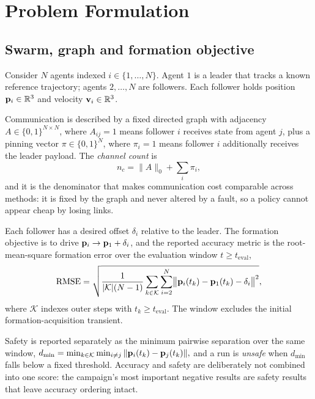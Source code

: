 \section{Problem Formulation}
\label{sec:problem}

\subsection{Swarm, graph and formation objective}

Consider $N$ agents indexed $i \in \{1,\dots,N\}$. Agent $1$ is a leader
that tracks a known reference trajectory; agents $2,\dots,N$ are followers.
Each follower holds position $\mathbf{p}_i \in \mathbb{R}^3$ and velocity
$\mathbf{v}_i \in \mathbb{R}^3$.

Communication is described by a fixed directed graph with adjacency
$A \in \{0,1\}^{N \times N}$, where $A_{ij}=1$ means follower $i$ receives
state from agent $j$, plus a pinning vector $\pi \in \{0,1\}^{N}$, where
$\pi_i = 1$ means follower $i$ additionally receives the leader payload.
The \emph{channel count} is
\begin{equation}
n_c = \|A\|_0 + \textstyle\sum_i \pi_i ,
\label{eq:channels}
\end{equation}
and it is the denominator that makes communication cost comparable across
methods: it is fixed by the graph and never altered by a fault, so a
policy cannot appear cheap by losing links.

Each follower has a desired offset $\delta_i$ relative to the leader. The
formation objective is to drive
$\mathbf{p}_i \to \mathbf{p}_1 + \delta_i$, and the reported accuracy metric is the
root-mean-square formation error over the evaluation window
$t \ge t_{\mathrm{eval}}$,
\begin{equation}
\mathrm{RMSE} =
\sqrt{\frac{1}{|\mathcal{K}|(N-1)}
\sum_{k \in \mathcal{K}} \sum_{i=2}^{N}
\bigl\| \mathbf{p}_i(t_k) - \mathbf{p}_1(t_k) - \delta_i \bigr\|^2 } ,
\label{eq:rmse}
\end{equation}
where $\mathcal{K}$ indexes outer steps with $t_k \ge t_{\mathrm{eval}}$.
The window excludes the initial formation-acquisition transient.

Safety is reported separately as the minimum pairwise separation over the
same window,
$
d_{\min} = \min_{k \in \mathcal{K}} \min_{i \ne j} \| \mathbf{p}_i(t_k) -
\mathbf{p}_j(t_k) \|,
$
and a run is \emph{unsafe} when $d_{\min}$ falls below a fixed threshold.
Accuracy and safety are deliberately not combined into one score: the
campaign's most important negative results are safety results that leave
accuracy ordering intact.

